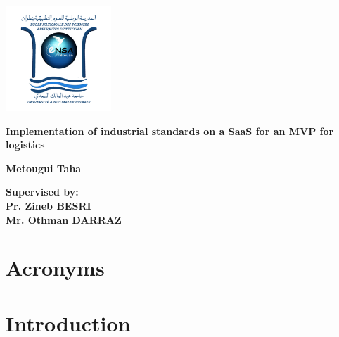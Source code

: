 \documentclass[11pt]{article}
\begin{document}
    \thispagestyle{empty}

    \begin{titlepage}
        \begin{center}
            \includegraphics[width=150px]{images/logoEnsa}

            \vspace*{2cm}

            \Large
            \textbf{Implementation of industrial standards on a SaaS for an MVP for logistics}

            \vspace{0.5cm}
            \large
            \textbf{Metougui Taha}

            \vspace{1.5 cm}

            \textbf{Supervised by:}\\
            \vspace{0.5cm}
            \textbf{Pr. Zineb BESRI}\\
            \vspace{0.5cm}
            \textbf{Mr. Othman DARRAZ}

            \vspace{0.8 cm}
        \end{center}
    \end{titlepage}

    \newpage

    \begin{abstract}

    \end{abstract}

    \newpage

    \section{Acronyms}\label{sec:acronyms}
    

    \newpage

    \tableofcontents

    \newpage

    \section{Introduction}\label{sec:introduction}
    
\end{document}
